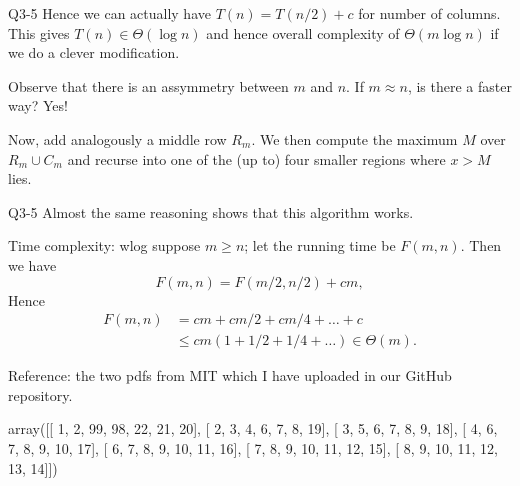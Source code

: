 \documentclass[t]{beamer}
\def\le{\leqslant}
\def\ge{\geqslant}
\begin{document}
\begin{frame}{Q3-5}
  Hence we can actually have $T(n) = T(n/2)+c$ for number of columns. This gives $T(n) \in \Theta(\log{n})$ and hence overall complexity of $\Theta(m\log{n})$ if we do a clever modification. 
  \par Observe that there is an assymmetry between $m$ and $n$. If $m \approx n$, is there a faster way? Yes!
  \begin{center}
  \end{center}
  \par Now, add analogously a middle row $R_m$. We then compute the maximum $M$ over $R_m \cup C_m$ and recurse into one of the (up to) four smaller regions where $x>M$ lies. 
\end{frame}
\begin{frame}{Q3-5}
  Almost the same reasoning shows that this algorithm works. 
  \par Time complexity: wlog suppose $m \ge n$; let the running time be $F(m, n)$. Then we have
  \[F(m, n) = F(m/2, n/2)+cm, \]
  Hence
  \begin{align*}
    F(m, n) &= cm+cm/2+cm/4+\dots +c  \\ &\le cm(1+1/2+1/4+\dots) \in \Theta(m).
  \end{align*}
  \par Reference: the two pdfs from MIT which I have uploaded in our GitHub repository. 
\end{frame}
array([[ 1,  2, 99, 98, 22, 21, 20],
       [ 2,  3,  4,  6,  7,  8, 19],
       [ 3,  5,  6,  7,  8,  9, 18],
       [ 4,  6,  7,  8,  9, 10, 17],
       [ 6,  7,  8,  9, 10, 11, 16],
       [ 7,  8,  9, 10, 11, 12, 15],
       [ 8,  9, 10, 11, 12, 13, 14]])
\fi
\end{document}
